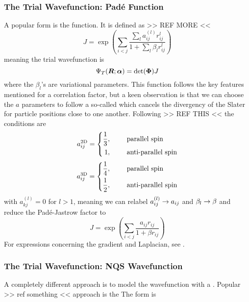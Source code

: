     \subsubsection{The Trial Wavefunction: Pad\'e
        Function\label{sususec:TWFPadeJastrow}} A popular form is the
         function. It is defined as\cite{basicMB} >> REF
        MORE <<
            \begin{equation}
                J = \exp\left(\sum\limits_{i<j}\frac{\sum\limits_la^{(l)}_{ij}
                r^l_{ij}}{1 + \sum\limits_l \beta_l r^l_{ij}}\right)
            \end{equation}
        meaning the trial wavefunction is
            \begin{equation}
                {\Psi}_T(\boldsymbol{{R}};\boldsymbol{{\alpha}}) = \det(\boldsymbol{{\Phi}})J
            \end{equation}
        where the $\beta_l$'s are variational parameters. This function follows
        the key features mentioned for a correlation factor, but a keen
        observation is that we can choose the $a$ parameters to follow a
        so-called  which cancels the divergency of the
        Slater for particle positions close to one another.  Following >> REF
        THIS << the conditions are
            \begin{equation}
                a^{\text{2D}}_{ij} = \left\{\begin{aligned}
                        \frac{1}{3},&\indent& &\text{parallel spin} \\
                        1,&\indent& &\text{anti-parallel spin} \\
                    \end{aligned}\right.
            \end{equation}
            \begin{equation}
                a^{\text{3D}}_{ij} = \left\{\begin{aligned}
                        \frac{1}{4},&\indent& &\text{parallel spin} \\
                        \frac{1}{2},&\indent& &\text{anti-parallel spin} \\
                    \end{aligned}\right.
            \end{equation}
        with $a^{(l)}_{kj}=0$ for $l>1$, meaning we can relabel
        $a^{(l)}_{ij}\rightarrow a_{ij}$ and $\beta_l\rightarrow \beta$ and reduce the
        Pad\'e-Jastrow factor to
            \begin{equation}
                J = \exp\left(\sum\limits_{i<j}\frac{a_{ij} r_{ij}}{1 + \beta
                r_{ij}}\right)
            \end{equation}
        For expressions concerning the gradient and Laplacian, see
        .

    \subsubsection{The Trial Wavefunction: NQS
    Wavefunction\label{sususec:NQSJastrow}}
        A completely different approach is to model the wavefunction with a
        . Popular >> ref something << approach is the
         The form is
